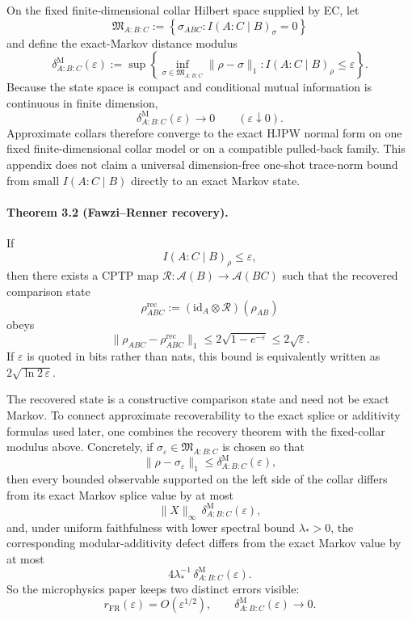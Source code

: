On the fixed finite-dimensional collar Hilbert space supplied by EC, let
\[
\mathfrak M_{A:B:C}
:=
\left\{
\sigma_{ABC}: I(A:C\mid B)_\sigma=0
\right\}
\]
and define the exact-Markov distance modulus
\[
\delta^{\mathrm M}_{A:B:C}(\varepsilon)
:=
\sup\left\{
\inf_{\sigma\in\mathfrak M_{A:B:C}}\|\rho-\sigma\|_1:
I(A:C\mid B)_\rho\le\varepsilon
\right\}.
\]
Because the state space is compact and conditional mutual information is continuous in finite
dimension,
\[
\delta^{\mathrm M}_{A:B:C}(\varepsilon)\longrightarrow0
\qquad
(\varepsilon\downarrow0).
\]
Approximate collars therefore converge to the exact HJPW normal form on one fixed
finite-dimensional collar model or on a compatible pulled-back family. This appendix does not
claim a universal dimension-free one-shot trace-norm bound from small \(I(A:C\mid B)\) directly
to an exact Markov state.

\paragraph{\textbf{Theorem 3.2 (Fawzi--Renner recovery).}}
If
\[
I(A:C\mid B)_\rho\le\varepsilon,
\]
then there exists a CPTP map \(\mathcal R:\mathcal A(B)\to\mathcal A(BC)\) such that the
recovered comparison state
\[
\rho^{\mathrm{rec}}_{ABC}
:=
(\mathrm{id}_A\otimes\mathcal R)(\rho_{AB})
\]
obeys
\[
\|\rho_{ABC}-\rho^{\mathrm{rec}}_{ABC}\|_1
\le
2\sqrt{1-e^{-\varepsilon}}
\le
2\sqrt{\varepsilon}.
\]
If \(\varepsilon\) is quoted in bits rather than nats, this bound is equivalently written as
\(2\sqrt{\ln 2\,\varepsilon}\).

The recovered state is a constructive comparison state and need not be exact Markov. To connect
approximate recoverability to the exact splice or additivity formulas used later, one combines the
recovery theorem with the fixed-collar modulus above. Concretely, if
\(\sigma_\varepsilon\in\mathfrak M_{A:B:C}\) is chosen so that
\[
\|\rho-\sigma_\varepsilon\|_1
\le
\delta^{\mathrm M}_{A:B:C}(\varepsilon),
\]
then every bounded observable supported on the left side of the collar differs from its exact
Markov splice value by at most
\[
\|X\|_\infty\,\delta^{\mathrm M}_{A:B:C}(\varepsilon),
\]
and, under uniform faithfulness with lower spectral bound \(\lambda_\ast>0\), the corresponding
modular-additivity defect differs from the exact Markov value by at most
\[
4\lambda_\ast^{-1}\,\delta^{\mathrm M}_{A:B:C}(\varepsilon).
\]
So the microphysics paper keeps two distinct errors visible:
\[
r_{\mathrm{FR}}(\varepsilon)=O(\varepsilon^{1/2}),
\qquad
\delta^{\mathrm M}_{A:B:C}(\varepsilon)\to0.
\]

